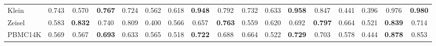 \begin{table}[t]
\begin{tabular}{lcccccccccccccccc}
Klein & 0.743 & 0.570 & \textbf{0.767} & 0.724 & 0.562 & 0.618 & \textbf{0.948} & 0.792 & 0.732 & 0.633 & \textbf{0.958} & 0.847 & 0.441 & 0.396 & 0.976 & \textbf{0.980} \\
Zeisel & 0.583 & \textbf{0.832} & 0.740 & 0.809 & 0.400 & 0.566 & 0.657 & \textbf{0.763} & 0.559 & 0.620 & 0.692 & \textbf{0.797} & 0.664 & 0.521 & \textbf{0.839} & 0.714 \\
PBMC14K & 0.569 & 0.567 & \textbf{0.693} & 0.633 & 0.565 & 0.518 & \textbf{0.722} & 0.688 & 0.664 & 0.522 & \textbf{0.729} & 0.703 & 0.578 & 0.444 & \textbf{0.878} & 0.853 \\
\bottomrule
\end{tabular}
\end{table}

